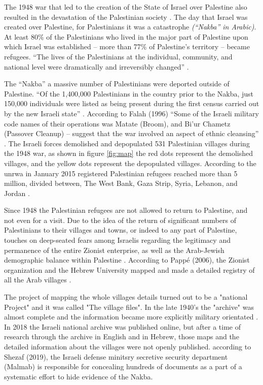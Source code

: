 The 1948 war that led to the creation of the State of Israel over Palestine also resulted in the devastation of the Palestinian society \citep{Sadi2007}. The day that Israel was created over Palestine, for Palestinians it was a catastrophe \textit{(“Nakba” in Arabic)}. At least 80\% of the Palestinians who lived in the major part of Palestine upon which Israel was established – more than 77\% of Palestine’s territory – became refugees. “The lives of the Palestinians at the individual,
community, and national level were dramatically and irreversibly changed” \citep{Sadi2007}.








The “Nakba” a massive number of Palestinians were deported outside of Palestine. “Of the
1,400,000 Palestinians in the country prior to the Nakba, just 150,000 individuals were listed
as being present during the first census carried out by the new Israeli state” \citep{Sanbar2007}.
According to Falah (1996) “Some of the Israeli military code names of their operations was
Matate (Broom), and Bi’ur Chametz (Passover Cleanup) – suggest that the war involved an
aspect of ethnic cleansing” \citep{Falah1996}\citep{Pappe2006}. The Israeli forces demolished and depopulated 531
Palestinian villages during the 1948 war, as shown in figure \ref{fig:map} the red dots represent the demolished villages, and the yellow dots represent the depopulated villages. According to the \acrshort{unrwa} in January 2015 registered
Palestinian refugees reached more than 5 million, divided between, The West Bank, Gaza
Strip, Syria, Lebanon, and Jordan \citep{DajaniDaoudi2011}. 

Since 1948 the Palestinian refugees are not allowed to return to Palestine, and not even for a visit. Due to the idea of the return of significant numbers of Palestinians to their villages and towns, or indeed to any part of Palestine, touches on deep-seated fears among Israelis regarding the legitimacy and permanence of the entire Zionist enterprise, as well as the Arab-Jewish demographic balance within Palestine \citep{Khalidi2016}. According to Pappé (2006), the Zionist organization and the Hebrew University mapped and made a detailed registry of all the Arab villages \citep{Pappe2006}.



The project of mapping the whole villages details turned out to be a "national Project" and it was called "The village files"\citep{Pappe2006}. In the late 1940's the "archive" was almost complete and the information became more explicitly military orientated \citep{Pappe2006}. In 2018 the Israeli national archive was published online, but after a time of research through the archive in English and in Hebrew, those maps and the detailed information about the villages were not openly published. according to Shezaf (2019), the Israeli defense minitsry secretive security department (Malmab) is responsible for concealing hundreds of documents as a part of a systematic effort to hide evidence of the Nakba.

